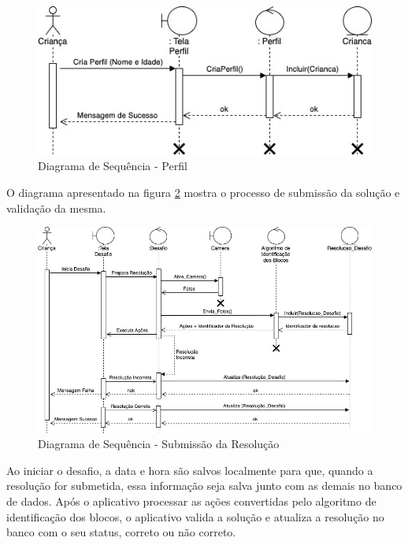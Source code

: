         \begin{figure}[H]
            \caption{Diagrama de Sequência - Perfil}
            \begin{center}
                \includegraphics[width=\linewidth]{Imagens/cap3/Sequencia_Perfil.jpg}
            \end{center}
            \label{figura:sequencia_perfil}
        \end{figure}
        
        
        O diagrama apresentado na figura \ref{figura:sequencia_jogo} mostra o processo de submissão da solução e validação da mesma.
        
        \begin{figure}[H]
            \caption{Diagrama de Sequência - Submissão da Resolução}
            \begin{center}
                \includegraphics[width=\linewidth]{Imagens/cap3/Sequencia_Jogo.jpg}
            \end{center}
            \label{figura:sequencia_jogo}
        \end{figure}
        
        Ao iniciar o desafio, a data e hora são salvos localmente para que, quando a resolução for submetida, essa informação seja salva junto com as demais no banco de dados.
        Após o aplicativo processar as ações convertidas pelo algoritmo de identificação dos blocos, o aplicativo valida a solução e atualiza a resolução no banco com o seu status, correto ou não correto.